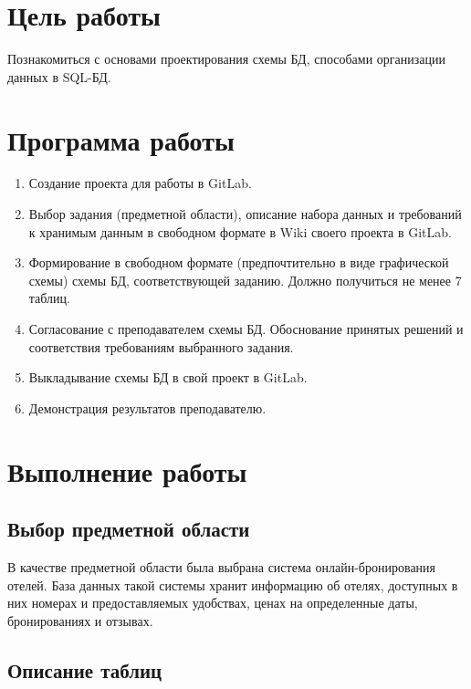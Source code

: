 





\tableofcontents
\newpage

\section{Цель работы}

Познакомиться с основами проектирования схемы БД, способами организации данных в SQL-БД.

\section{Программа работы}

\begin{enumerate}
	\item Создание проекта для работы в GitLab.
	\item Выбор задания (предметной области), описание набора данных и требований к хранимым данным в свободном формате в Wiki своего проекта в GitLab.
	\item Формирование в свободном формате (предпочтительно в виде графической схемы) схемы БД, соответствующей заданию. Должно получиться не менее 7 таблиц.
	\item Согласование с преподавателем схемы БД. Обоснование принятых решений и соответствия требованиям выбранного задания. 
	\item Выкладывание схемы БД в свой проект в GitLab.
	\item Демонстрация результатов преподавателю.
\end{enumerate}

\section{Выполнение работы}


\subsection{Выбор предметной области}

В качестве предметной области была выбрана система онлайн-бронирования отелей. База данных такой системы хранит информацию об отелях, доступных в них номерах и предоставляемых удобствах, ценах на определенные даты, бронированиях и отзывах.

\subsection{Описание таблиц}

